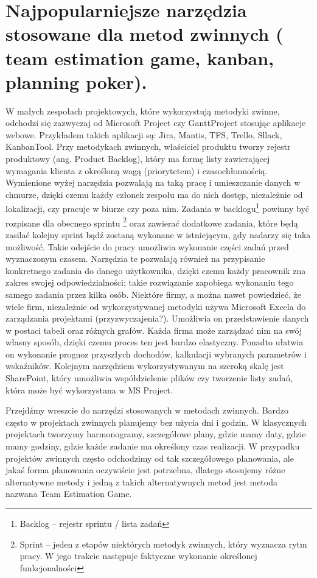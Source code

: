 \newpage

\section{Najpopularniejsze narzędzia stosowane dla metod zwinnych ( team estimation game, kanban, planning poker).}

W małych zespołach projektowych, które wykorzystują metodyki zwinne, odchodzi się zazwyczaj od Microsoft Project czy GanttProject stosując aplikacje webowe. Przykładem takich aplikacji są: Jira, Mantis, TFS, Trello, Sllack, KanbanTool. 
Przy metodykach zwinnych, właściciel produktu tworzy rejestr produktowy (ang. Product Backlog), który ma formę listy zawierającej wymagania klienta z określoną wagą  (priorytetem) i czasochłonnością.\cite{Shwaber_2004} Wymienione wyżej narzędzia pozwalają na taką pracę i umieszczanie danych w chmurze, dzięki czemu każdy członek zespołu ma do nich dostęp, niezależnie od lokalizacji, czy pracuje w biurze czy poza nim. Zadania w backlogu\footnote{Backlog – rejestr sprintu / lista zadań\cite{metody_zwinne_2016}} powinny być rozpisane dla obecnego sprintu \footnote{Sprint – jeden z etapów niektórych metodyk zwinnych, który wyznacza rytm pracy. W jego
trakcie następuje faktyczne wykonanie określonej funkcjonalności\cite{Samoorganizacja_2010}} oraz zawierać dodatkowe zadania, które będą zasilać kolejny sprint bądź zostaną wykonane w istniejącym, gdy nadarzy się taka możliwość. Takie odejście do pracy umożliwia wykonanie części zadań przed wyznaczonym czasem. Narzędzia te pozwalają również na przypisanie konkretnego zadania do danego użytkownika, dzięki czemu każdy pracownik zna zakres swojej odpowiedzialności; takie rozwiązanie zapobiega wykonaniu tego samego zadania przez kilka osób.
Niektóre firmy, a można nawet powiedzieć, że wiele firm, niezależnie od wykorzystywanej metodyki używa Microsoft Excela do zarządzania projektami (przyzwyczajenia?). Umożliwia on przedstawienie danych w postaci tabeli oraz różnych grafów. Każda firma może zarządzać nim na swój własny sposób, dzięki czemu proces ten jest bardzo elastyczny. Ponadto ułatwia on wykonanie prognoz przyszłych dochodów, kalkulacji wybranych parametrów i wskaźników. Kolejnym narzędziem wykorzystywanym na szeroką skalę jest SharePoint, który umożliwia współdzielenie plików czy tworzenie listy zadań, która może być wykorzystana w MS Project.

Przejdźmy wreszcie do narzędzi stosowanych w metodach zwinnych. Bardzo często w projektach zwinnych planujemy bez użycia dni i godzin. W klasycznych projektach tworzymy harmonogramy, szczegółowe plany, gdzie mamy daty, gdzie mamy godziny, gdzie każde zadanie ma określony czas realizacji. W przypadku projektów zwinnych często odchodzimy od tak szczegółowego planowania, ale jakaś forma planowania oczywiście jest potrzebna, dlatego stosujemy różne alternatywne metody i jedną z takich alternatywnych metod jest metoda nazwana Team Estimation Game.



